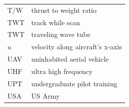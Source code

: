 \documentclass[
]{book}
\begin{document}
\begin{longtable}[]{@{}ll@{}}
\begin{minipage}[t]{0.47\columnwidth}
T/W\strut
\end{minipage} & \begin{minipage}[t]{0.47\columnwidth}\raggedright
thrust to weight ratio\strut
\end{minipage}\tabularnewline
\begin{minipage}[t]{0.47\columnwidth}\raggedright
TWT\strut
\end{minipage} & \begin{minipage}[t]{0.47\columnwidth}\raggedright
track while scan\strut
\end{minipage}\tabularnewline
\begin{minipage}[t]{0.47\columnwidth}\raggedright
TWT\strut
\end{minipage} & \begin{minipage}[t]{0.47\columnwidth}\raggedright
traveling wave tube\strut
\end{minipage}\tabularnewline
\begin{minipage}[t]{0.47\columnwidth}\raggedright
\(u\)\strut
\end{minipage} & \begin{minipage}[t]{0.47\columnwidth}\raggedright
velocity along aircraft's x-axis\strut
\end{minipage}\tabularnewline
\begin{minipage}[t]{0.47\columnwidth}\raggedright
UAV\strut
\end{minipage} & \begin{minipage}[t]{0.47\columnwidth}\raggedright
uninhabited aerial vehicle\strut
\end{minipage}\tabularnewline
\begin{minipage}[t]{0.47\columnwidth}\raggedright
UHF\strut
\end{minipage} & \begin{minipage}[t]{0.47\columnwidth}\raggedright
ultra high frequency\strut
\end{minipage}\tabularnewline
\begin{minipage}[t]{0.47\columnwidth}\raggedright
UPT\strut
\end{minipage} & \begin{minipage}[t]{0.47\columnwidth}\raggedright
undergraduate pilot training\strut
\end{minipage}\tabularnewline
\begin{minipage}[t]{0.47\columnwidth}\raggedright
USA\strut
\end{minipage} & \begin{minipage}[t]{0.47\columnwidth}\raggedright
US Army\strut

\end{minipage}
\end{longtable}
\end{document}
